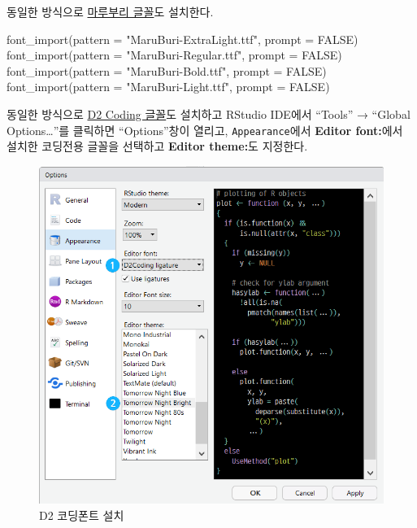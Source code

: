 \documentclass[
  letterpaper,
]{book}
\newenvironment{Shaded}{\begin{snugshade}}{\end{snugshade}}
\newcommand{\AttributeTok}[1]{\textcolor[rgb]{0.40,0.45,0.13}{#1}}
\newcommand{\ConstantTok}[1]{\textcolor[rgb]{0.56,0.35,0.01}{#1}}
\newcommand{\FunctionTok}[1]{\textcolor[rgb]{0.28,0.35,0.67}{#1}}
\newcommand{\NormalTok}[1]{\textcolor[rgb]{0.00,0.23,0.31}{#1}}
\newcommand{\StringTok}[1]{\textcolor[rgb]{0.13,0.47,0.30}{#1}}
\begin{document}
동일한 방식으로 \href{https://hangeul.naver.com/maruproject_11}{마루부리
글꼴}도 설치한다.

\begin{Shaded}
\begin{Highlighting}[]
\FunctionTok{font\_import}\NormalTok{(}\AttributeTok{pattern =} \StringTok{"MaruBuri{-}ExtraLight.ttf"}\NormalTok{, }\AttributeTok{prompt =} \ConstantTok{FALSE}\NormalTok{)}
\FunctionTok{font\_import}\NormalTok{(}\AttributeTok{pattern =} \StringTok{"MaruBuri{-}Regular.ttf"}\NormalTok{, }\AttributeTok{prompt =} \ConstantTok{FALSE}\NormalTok{)}
\FunctionTok{font\_import}\NormalTok{(}\AttributeTok{pattern =} \StringTok{"MaruBuri{-}Bold.ttf"}\NormalTok{, }\AttributeTok{prompt =} \ConstantTok{FALSE}\NormalTok{)}
\FunctionTok{font\_import}\NormalTok{(}\AttributeTok{pattern =} \StringTok{"MaruBuri{-}Light.ttf"}\NormalTok{, }\AttributeTok{prompt =} \ConstantTok{FALSE}\NormalTok{)}
\end{Highlighting}
\end{Shaded}

동일한 방식으로 \href{https://github.com/naver/d2codingfont}{D2 Coding
글꼴}도 설치하고 RStudio IDE에서 ``Tools'' → ``Global
Options\ldots{}''를 클릭하면 ``Options''창이 열리고,
\texttt{Appearance}에서 \textbf{Editor font:}에서 설치한 코딩전용 글꼴을
선택하고 \textbf{Editor theme:}도 지정한다.

\begin{figure}

{\centering \includegraphics{images/font_d2coding.png}

}

\caption{D2 코딩폰트 설치}

\end{figure}
\end{document}
